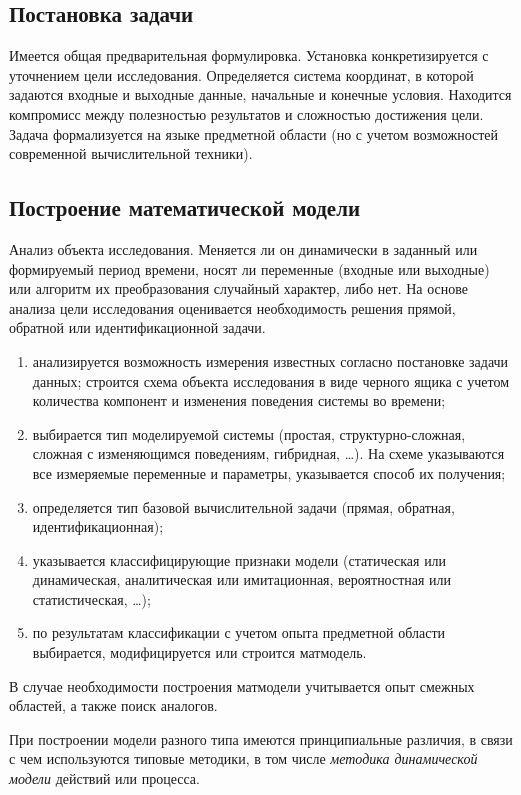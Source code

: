 \documentclass[12pt]{article}
\begin{document}
\subsection{Постановка задачи}
Имеется общая предварительная формулировка. Установка конкретизируется с уточнением цели исследования. Определяется система координат, в которой задаются входные и выходные данные, начальные и конечные условия. Находится компромисс между полезностью результатов и сложностью достижения цели. Задача формализуется на языке предметной области (но с учетом возможностей современной вычислительной техники).

\subsection{Построение математической модели}
Анализ объекта исследования. Меняется ли он динамически в заданный или формируемый период времени, носят ли переменные (входные или выходные) или алгоритм их преобразования случайный характер, либо нет. На основе анализа цели исследования оценивается необходимость решения прямой, обратной или идентификационной задачи.

\begin{enumerate}
    \item анализируется возможность измерения известных согласно постановке задачи данных; строится схема объекта исследования в виде черного ящика с учетом количества компонент и изменения поведения системы во времени;
    \item выбирается тип моделируемой системы (простая, структурно-сложная, сложная с изменяющимся поведениям, гибридная, \ldots). На схеме указываются все измеряемые переменные и параметры, указывается способ их получения;
    \item определяется тип базовой вычислительной задачи (прямая, обратная, идентификационная);
    \item указывается классифицирующие признаки модели (статическая или динамическая, аналитическая или имитационная, вероятностная или статистическая, \ldots);
    \item по результатам классификации с учетом опыта предметной области выбирается, модифицируется или строится матмодель.
\end{enumerate}

В случае необходимости построения матмодели учитывается опыт смежных областей, а также поиск аналогов.

При построении модели разного типа имеются принципиальные различия, в связи с чем используются типовые методики, в том числе \emph{методика динамической модели} действий или процесса.\\
\end{document}

